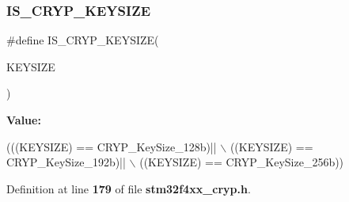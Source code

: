 \subsubsection{I\+S\+\_\+\+C\+R\+Y\+P\+\_\+\+K\+E\+Y\+S\+I\+ZE}
{\footnotesize\ttfamily \#define I\+S\+\_\+\+C\+R\+Y\+P\+\_\+\+K\+E\+Y\+S\+I\+ZE(\begin{DoxyParamCaption}\item[{}]{K\+E\+Y\+S\+I\+ZE }\end{DoxyParamCaption})}

{\bfseries Value\+:}
\begin{DoxyCode}
(((KEYSIZE) == CRYP_KeySize_128b)|| \(\backslash\)
                                  ((KEYSIZE) == CRYP_KeySize_192b)|| \(\backslash\)
                                  ((KEYSIZE) == CRYP_KeySize_256b))
\end{DoxyCode}


Definition at line \textbf{ 179} of file \textbf{ stm32f4xx\+\_\+cryp.\+h}.

